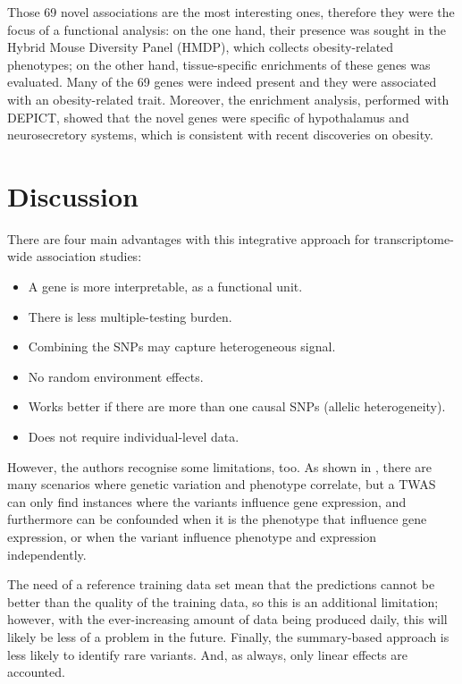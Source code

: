 \documentclass[../main.tex]{subfiles}
\begin{document}
Those 69 novel associations are the most interesting ones, therefore 
they were the focus of a functional analysis: on the one hand, their 
presence was sought in the Hybrid Mouse Diversity Panel (HMDP), which 
collects obesity-related phenotypes; on the other hand, tissue-specific 
enrichments of these genes was evaluated. Many of the 69 genes were 
indeed present and they were associated with an obesity-related trait. 
Moreover, the enrichment analysis, performed with DEPICT, showed that 
the novel genes were specific of hypothalamus and neurosecretory 
systems, which is consistent with recent discoveries on 
obesity.

\section{Discussion}

There are four main advantages with this integrative approach for 
transcriptome-wide association studies:

\begin{itemize}
	\item A gene is more interpretable, as a functional unit.
	\item There is less multiple-testing burden.
	\item Combining the SNPs may capture heterogeneous signal.
	\item No random environment effects.
	\item Works better if there are more than one causal SNPs (allelic 
heterogeneity).
	\item Does not require individual-level data.
\end{itemize}

However, the authors recognise some limitations, too. As shown in 
, there are many scenarios where genetic variation 
and phenotype correlate, but a TWAS can only find instances where the 
variants influence gene expression, and furthermore can be confounded 
when it is the phenotype that influence gene expression, or when the 
variant influence phenotype and expression independently.

The need of a reference training data set mean that the predictions 
cannot be better than the quality of the training data, so this is an 
additional limitation; however, with the ever-increasing amount of data 
being produced daily, this will likely be less of a problem in the 
future. Finally, the summary-based approach is less likely to identify 
rare variants. And, as always, only linear effects are 
accounted.
\end{document}
